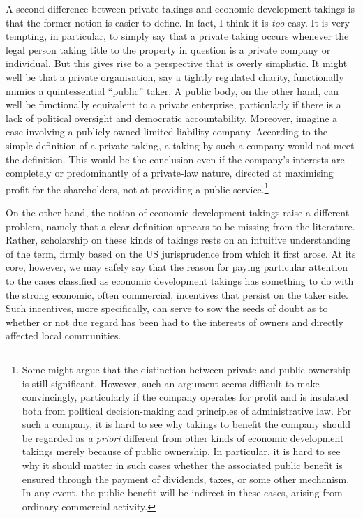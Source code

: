 {A second difference between private takings and economic development takings is that the former notion is easier to define. In fact, I think it is {\it too} easy. It is very tempting, in particular, to simply say that a private taking occurs whenever the legal person taking title to the property in question is a private company or individual. But this gives rise to a perspective that is overly simplistic. It might well be that a private organisation, say a tightly regulated charity, functionally mimics a quintessential ``public'' taker. A public body, on the other hand, can well be functionally equivalent to a private enterprise, particularly if there is a lack of political oversight and democratic accountability. Moreover, imagine a case involving a publicly owned limited liability company. According to the simple definition of a private taking, a taking by such a company would not meet the definition. This would be the conclusion even if the company's interests are completely or predominantly of a private-law nature, directed at maximising profit for the shareholders, not at providing a public service.\footnote{Some might argue that the distinction between private and public ownership is still significant. However, such an argument seems difficult to make convincingly, particularly if the company operates for profit and is  insulated both from political decision-making and principles of administrative law. For such a company, it is hard to see why takings to benefit the company should be regarded as {\it a priori} different from other kinds of economic development takings merely because of public ownership. In particular, it is hard to see why it should matter in such cases whether the associated public benefit is ensured through the payment of dividends, taxes, or some other mechanism. In any event, the public benefit will be indirect in these cases, arising from ordinary commercial activity.}

On the other hand, the notion of economic development takings raise a different problem, namely that a 
clear definition appears to be missing from the literature. Rather, scholarship on these kinds of takings rests on an intuitive understanding of the term, firmly based on the US jurisprudence from which it first arose. At its core, however, we may safely say that the reason for paying particular attention to the cases classified as economic development takings has something to do with the strong economic, often commercial, incentives that persist on the taker side. Such incentives, more specifically, can serve to sow the seeds of doubt as to whether or not due regard has been had to the interests of owners and directly affected local communities.

}
